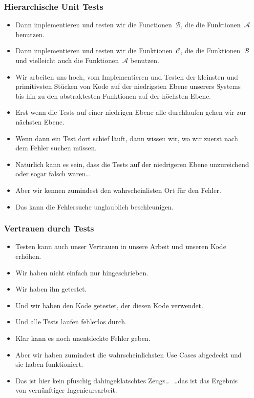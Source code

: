 \documentclass[aspectratio=169,mathserif,notheorems]{beamer}%
\begin{document}
\begin{frame}[t]%
\frametitle{Hierarchische Unit Tests}%
\begin{itemize}%
%
%
%
%
\item<4-> Dann implementieren und testen wir die Functionen~$\mathcal{B}$, die die Funktionen~$\mathcal{A}$ benutzen.%
%
\item<5-> Dann implementieren und testen wir die Funktionen~$\mathcal{C}$, die die Funktionen~$\mathcal{B}$ und vielleicht auch die Funktionen~$\mathcal{A}$ benutzen.%
%
\item<6-> Wir arbeiten uns hoch, vom Implementieren und Testen der kleinsten und primitivsten Stücken von Kode auf der niedrigsten Ebene unserers Systems bis hin zu den abstraktesten Funktionen auf der höchsten Ebene.%
%
\item<7-> Erst wenn die Tests auf einer niedrigen Ebene alle durchlaufen gehen wir zur nächsten Ebene.%
%
\item<8-> Wenn dann ein Test dort schief läuft, dann wissen wir, wo wir zuerst nach dem Fehler suchen müssen.%
%
\item<9-> Natürlich kann es sein, dass die Tests auf der niedrigeren Ebene unzureichend oder sogar falsch waren\dots%
%
\item<10-> Aber wir kennen zumindest den wahrscheinlisten Ort für den Fehler.%
%
\item<11-> Das kann die Fehlersuche unglaublich beschleunigen.%
\end{itemize}%
\end{frame}%
%
\begin{frame}%
\frametitle{Vertrauen durch Tests}%
\begin{itemize}%
\item Testen kann auch unser Vertrauen in unsere Arbeit und unseren Kode erhöhen.%
%
\item<2-> Wir haben  nicht einfach nur hingeschrieben.%
%
\item<3-> Wir haben ihn getestet.%
%
\item<4-> Und wir haben den Kode getestet, der diesen Kode verwendet.%
%
\item<5-> Und alle Tests laufen fehlerlos durch.%
%
\item<6-> Klar kann es noch unentdeckte Fehler geben.%
%
\item<7-> Aber wir haben zumindest die wahrscheinlichsten Use Cases abgedeckt und sie haben funktioniert.%
%
\item<8-> Das ist hier kein pfuschig dahingeklatschtes Zeugs\dots\ {\dots}das ist das Ergebnis von vernünftiger Ingenieursarbeit.%
\end{itemize}%
\end{frame}%
\end{document}
